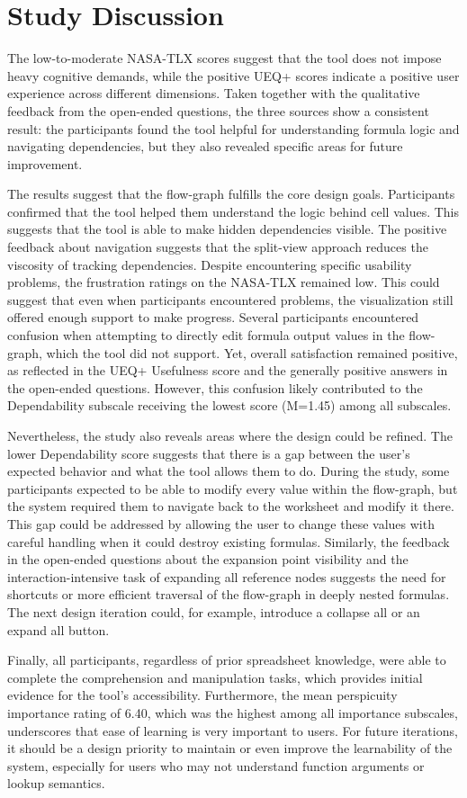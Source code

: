\section{Study Discussion}
The low-to-moderate NASA-TLX scores suggest that the tool does not impose heavy cognitive demands, while the positive UEQ+ scores indicate a positive user experience across different dimensions. Taken together with the qualitative feedback from the open-ended questions, the three sources show a consistent result: the participants found the tool helpful for understanding formula logic and navigating dependencies, but they also revealed specific areas for future improvement.

The results suggest that the flow-graph fulfills the core design goals. Participants confirmed that the tool helped them understand the logic behind cell values. This suggests that the tool is able to make hidden dependencies visible. The positive feedback about navigation suggests that the split-view approach reduces the viscosity of tracking dependencies. Despite encountering specific usability problems, the frustration ratings on the NASA-TLX remained low. This could suggest that even when participants encountered problems, the visualization still offered enough support to make progress. Several participants encountered confusion when attempting to directly edit formula output values in the flow-graph, which the tool did not support. Yet, overall satisfaction remained positive, as reflected in the UEQ+ Usefulness score and the generally positive answers in the open-ended questions. However, this confusion likely contributed to the Dependability subscale receiving the lowest score (M=1.45) among all subscales. 

Nevertheless, the study also reveals areas where the design could be refined. The lower Dependability score suggests that there is a gap between the user's expected behavior and what the tool allows them to do.
During the study, some participants expected to be able to modify every value within the flow-graph, but the system required them to navigate back to the worksheet and modify it there. This gap could be addressed by allowing the user to change these values with careful handling when it could destroy existing formulas. Similarly, the feedback in the open-ended questions about the expansion point visibility and the interaction-intensive task of expanding all reference nodes suggests the need for shortcuts or more efficient traversal of the flow-graph in deeply nested formulas. The next design iteration could, for example, introduce a collapse all or an expand all button.

Finally, all participants, regardless of prior spreadsheet knowledge, were able to complete the comprehension and manipulation tasks, which provides initial evidence for the tool's accessibility. Furthermore, the mean perspicuity importance rating of 6.40, which was the highest among all importance subscales, underscores that ease of learning is very important to users. For future iterations, it should be a design priority to maintain or even improve the learnability of the system, especially for users who may not understand function arguments or lookup semantics.
